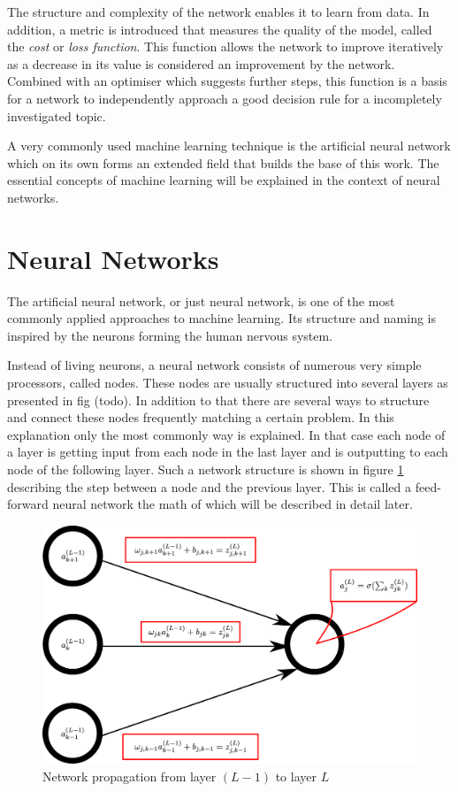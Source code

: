 The structure and complexity of the network enables it to learn from data. In addition, a metric is introduced that measures the quality of the model, called the \emph{cost} or \emph{loss function}. This function allows the network to improve iteratively as a decrease in its value is considered an improvement by the network. Combined with an optimiser which suggests further steps, this function is a basis for a network to independently approach a good decision rule for a incompletely investigated topic.

A very commonly used machine learning technique is the artificial neural network which on its own forms an extended field that builds the base of this work. The essential concepts of machine learning will be explained in the context of neural networks.

\section{Neural Networks}

The artificial neural network, or just neural network, is one of the most commonly applied approaches to machine learning. Its structure and naming is inspired by the neurons forming the human nervous system.

Instead of living neurons, a neural network consists of numerous very simple processors, called nodes.
 These nodes are usually structured into several layers as presented in fig (todo). In addition to that there are several ways to structure and connect these nodes frequently matching a certain problem. In this explanation only the most commonly way is explained. In that case each node of a layer is getting input from each node in the last layer and is outputting to each node of the following layer. Such a network structure is shown in figure \ref{fig:nodes_nomenclature} describing the step between a node and the previous layer. This is called a feed-forward neural network the math of which will be described in detail later.

\begin{figure}[htbp]
	\centering
	\includegraphics[scale=0.18]{figures_ML/nodes_nomenclature.eps}
	\caption[Network parameter nomenclature]{Network propagation from layer $(L-1)$ to layer $L$}
	\label{fig:nodes_nomenclature}
\end{figure}


